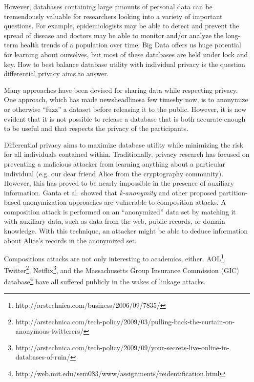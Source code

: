 \documentclass[12pt]{article}
\begin{document}
However, databases containing large amounts of personal data can be tremendously valuable for researchers looking into a variety of important questions.
For example, epidemiologists may be able to detect and prevent the spread of disease and doctors may be able to monitor and/or analyze the long-term health trends of a population over time.
Big Data offers us huge potential for learning about ourselves, but most of these databases are held under lock and key.
How to best balance database utility with individual privacy is the question differential privacy aims to answer.

Many approaches have been devised for sharing data while respecting privacy.
One approach, which has made news\footnotemark[\ref{fn:aol}] headlines\footnotemark[\ref{fn:twitter}] a few times\footnotemark[\ref{fn:netflix}] by now\footnotemark[\ref{fn:gic}], is to anonymize or otherwise ``fuzz'' a dataset before releasing it to the public.
However, it is now evident that it is not possible to release a database that is both accurate enough to be useful and that respects the privacy of the participants\cite{journals/cacm/Dwork11}.

Differential privacy aims to maximize database utility while minimizing the risk for all individuals contained within\cite{journals/cacm/Dwork11}.
Traditionally, privacy research has focused on preventing a malicious attacker from learning anything about a particular individual (e.g. our dear friend Alice from the cryptography community).
However, this has proved to be nearly impossible in the presence of auxiliary information.
Ganta et al. showed that \textit{k-anonymity} and other proposed partition-based anonymization approaches are vulnerable to composition attacks\cite{ganta2008composition}.
A composition attack is performed on an ``anonymized'' data set by matching it with auxiliary data, such as data from the web, public records, or domain knowledge.
With this technique, an attacker might be able to deduce information about Alice's records in the anonymized set.

Compositions attacks are not only interesting to academics, either.
AOL\footnote{\label{fn:aol} http://arstechnica.com/business/2006/09/7835/}, Twitter\footnote{\label{fn:twitter}http://arstechnica.com/tech-policy/2009/03/pulling-back-the-curtain-on-anonymous-twitterers/}, Netflix\footnote{\label{fn:netflix}http://arstechnica.com/tech-policy/2009/09/your-secrets-live-online-in-databases-of-ruin/}, and the Massachusetts Group Insurance Commission (GIC) database\footnote{\label{fn:gic}http://web.mit.edu/sem083/www/assignments/reidentification.html} have all suffered publicly in the wakes of linkage attacks.
\end{document}
